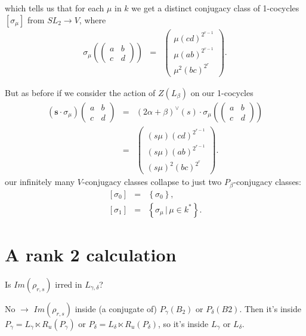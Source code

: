 which tells us that for each $\mu$ in $k$ we get a distinct conjugacy class of 1-cocycles $[\sigma_\mu]$ from $SL_2 \rightarrow V$, where
\begin{eqnarray*}
\sigma_\mu\left(\left(\begin{matrix} a & b \\ c & d \end{matrix}\right)\right) &=&
\left(\begin{matrix}  \mu(cd)^{2^{r-1}}  \\ \mu\left(ab \right)^{2^{r-1}} \\ \mu^2\left( bc \right)^{2^r} \end{matrix}\right).
\end{eqnarray*}

But as before if we consider the action of $Z(L_\beta)$ on our 1-cocycles
\begin{eqnarray*}
(\mathbf{s}\cdot \sigma_\mu)\left(\begin{matrix} a & b \\ c & d \end{matrix}\right) &=&
(2\alpha + \beta)^\vee(s) \cdot \sigma_\mu\left(\left(\begin{matrix} a & b \\ c & d \end{matrix}\right)\right)\\
&=&
\left(\begin{matrix}  (s\mu)(cd)^{2^{r-1}}  \\ (s\mu)\left(ab \right)^{2^{r-1}} \\ (s\mu)^2\left( bc \right)^{2^r} \end{matrix}\right).
\end{eqnarray*}
our infinitely many $V$-conjugacy classes collapse to just two $P_\beta$-conjugacy classes:
\begin{eqnarray*}
\left[\sigma_0\right] &=& \left\{ \sigma_0 \right\}, \\
\left[\sigma_1\right] &=& \left\{ \sigma_\mu \, | \, \mu \in k^* \right\}.
\end{eqnarray*}

\section{A rank 2 calculation}

Is $Im(\rho_{r,s})$ irred in $L_{\gamma,\delta}$?

No $\rightarrow$ $Im(\rho_{r,s})$ inside (a conjugate of) $P_\gamma(B_2)$ or $P_\delta(B2)$.
Then it's inside  $P_\gamma = L_\gamma \ltimes R_u(P_\gamma)$ or  $P_\delta = L_\delta \ltimes R_u(P_\delta)$, so it's inside $L_\gamma$ or $L_\delta$.

